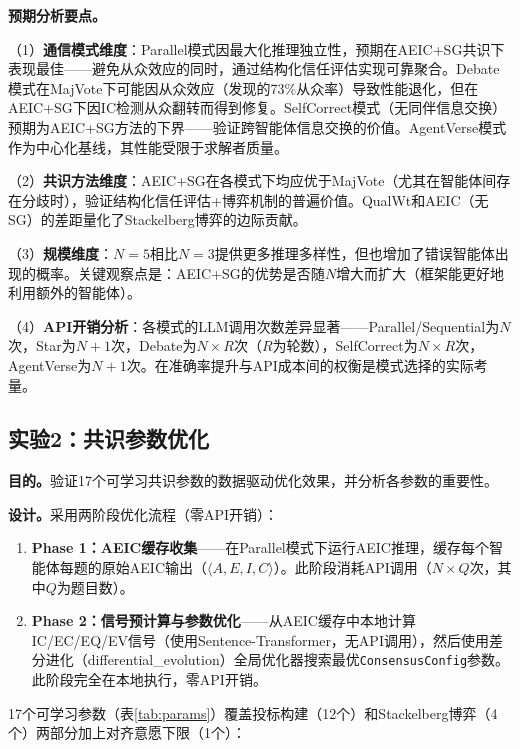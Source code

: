 \documentclass[12pt,a4paper,UTF8,fontset=fandol]{ctexart}
\begin{document}
\textbf{预期分析要点。}

（1）\textbf{通信模式维度}：Parallel模式因最大化推理独立性，预期在AEIC+SG共识下表现最佳——避免从众效应的同时，通过结构化信任评估实现可靠聚合。Debate模式在MajVote下可能因从众效应（\cite{bertalanic2026cost}发现的73\%从众率）导致性能退化，但在AEIC+SG下因IC检测从众翻转而得到修复。SelfCorrect模式（无同伴信息交换）预期为AEIC+SG方法的下界——验证跨智能体信息交换的价值。AgentVerse模式作为中心化基线，其性能受限于求解者质量。

（2）\textbf{共识方法维度}：AEIC+SG在各模式下均应优于MajVote（尤其在智能体间存在分歧时），验证结构化信任评估+博弈机制的普遍价值。QualWt和AEIC（无SG）的差距量化了Stackelberg博弈的边际贡献。

（3）\textbf{规模维度}：$N=5$相比$N=3$提供更多推理多样性，但也增加了错误智能体出现的概率。关键观察点是：AEIC+SG的优势是否随$N$增大而扩大（框架能更好地利用额外的智能体）。

（4）\textbf{API开销分析}：各模式的LLM调用次数差异显著——Parallel/Sequential为$N$次，Star为$N+1$次，Debate为$N \times R$次（$R$为轮数），SelfCorrect为$N \times R$次，AgentVerse为$N+1$次。在准确率提升与API成本间的权衡是模式选择的实际考量。

\subsection{实验2：共识参数优化}\label{sec:exp2}

\textbf{目的。}验证17个可学习共识参数的数据驱动优化效果，并分析各参数的重要性。

\textbf{设计。}采用两阶段优化流程（零API开销）：
\begin{enumerate}[nosep]
    \item \textbf{Phase 1：AEIC缓存收集}——在Parallel模式下运行AEIC推理，缓存每个智能体每题的原始AEIC输出（$\langle A, E, I, C \rangle$）。此阶段消耗API调用（$N \times Q$次，其中$Q$为题目数）。
    \item \textbf{Phase 2：信号预计算与参数优化}——从AEIC缓存中本地计算IC/EC/EQ/EV信号（使用Sentence-Transformer，无API调用），然后使用差分进化（differential\_evolution）全局优化器搜索最优\texttt{ConsensusConfig}参数。此阶段完全在本地执行，零API开销。
\end{enumerate}

17个可学习参数（表\ref{tab:params}）覆盖投标构建（12个）和Stackelberg博弈（4个）两部分加上对齐意愿下限（1个）：
\end{document}
